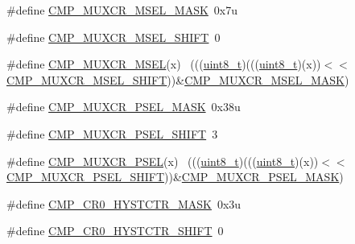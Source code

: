 \begin{DoxyCompactItemize}
\item 
\#define \hyperlink{group___c_m_p___register___masks_ga6ff83366097d3be5ae93234b68684cf5}{C\+M\+P\+\_\+\+M\+U\+X\+C\+R\+\_\+\+M\+S\+E\+L\+\_\+\+M\+A\+SK}~0x7u
\item 
\#define \hyperlink{group___c_m_p___register___masks_gad74d8206afe9b7ad009b0a7ac2bbf1cf}{C\+M\+P\+\_\+\+M\+U\+X\+C\+R\+\_\+\+M\+S\+E\+L\+\_\+\+S\+H\+I\+FT}~0
\item 
\#define \hyperlink{group___c_m_p___register___masks_ga61a47f441cc9f0145482ce3f1561160a}{C\+M\+P\+\_\+\+M\+U\+X\+C\+R\+\_\+\+M\+S\+EL}(x)                                            ~(((\hyperlink{_p_e___types_8h_aba7bc1797add20fe3efdf37ced1182c5}{uint8\+\_\+t})(((\hyperlink{_p_e___types_8h_aba7bc1797add20fe3efdf37ced1182c5}{uint8\+\_\+t})(x))$<$$<$\hyperlink{group___c_m_p___register___masks_gad74d8206afe9b7ad009b0a7ac2bbf1cf}{C\+M\+P\+\_\+\+M\+U\+X\+C\+R\+\_\+\+M\+S\+E\+L\+\_\+\+S\+H\+I\+FT}))\&\hyperlink{group___c_m_p___register___masks_ga6ff83366097d3be5ae93234b68684cf5}{C\+M\+P\+\_\+\+M\+U\+X\+C\+R\+\_\+\+M\+S\+E\+L\+\_\+\+M\+A\+SK})
\item 
\#define \hyperlink{group___c_m_p___register___masks_gaba9739da107b2a2b908af338d14df160}{C\+M\+P\+\_\+\+M\+U\+X\+C\+R\+\_\+\+P\+S\+E\+L\+\_\+\+M\+A\+SK}~0x38u
\item 
\#define \hyperlink{group___c_m_p___register___masks_gab686629f56ced4b88c699f0f610dece5}{C\+M\+P\+\_\+\+M\+U\+X\+C\+R\+\_\+\+P\+S\+E\+L\+\_\+\+S\+H\+I\+FT}~3
\item 
\#define \hyperlink{group___c_m_p___register___masks_gae2f01a26dfcb880ec6dcca859629c743}{C\+M\+P\+\_\+\+M\+U\+X\+C\+R\+\_\+\+P\+S\+EL}(x)                                            ~(((\hyperlink{_p_e___types_8h_aba7bc1797add20fe3efdf37ced1182c5}{uint8\+\_\+t})(((\hyperlink{_p_e___types_8h_aba7bc1797add20fe3efdf37ced1182c5}{uint8\+\_\+t})(x))$<$$<$\hyperlink{group___c_m_p___register___masks_gab686629f56ced4b88c699f0f610dece5}{C\+M\+P\+\_\+\+M\+U\+X\+C\+R\+\_\+\+P\+S\+E\+L\+\_\+\+S\+H\+I\+FT}))\&\hyperlink{group___c_m_p___register___masks_gaba9739da107b2a2b908af338d14df160}{C\+M\+P\+\_\+\+M\+U\+X\+C\+R\+\_\+\+P\+S\+E\+L\+\_\+\+M\+A\+SK})
\item 
\#define \hyperlink{group___c_m_p___register___masks_ga9a81a95d8ceda15abb107f3c961e2f03}{C\+M\+P\+\_\+\+C\+R0\+\_\+\+H\+Y\+S\+T\+C\+T\+R\+\_\+\+M\+A\+SK}~0x3u
\item 
\#define \hyperlink{group___c_m_p___register___masks_ga12a965eae39b79d9e6066de9af418df3}{C\+M\+P\+\_\+\+C\+R0\+\_\+\+H\+Y\+S\+T\+C\+T\+R\+\_\+\+S\+H\+I\+FT}~0

\end{DoxyCompactItemize}
